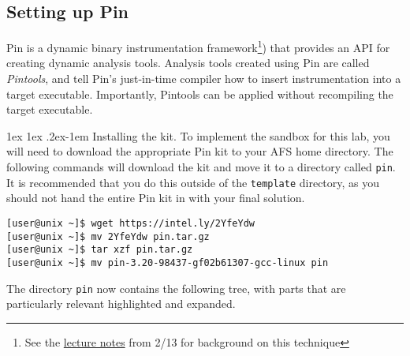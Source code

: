\documentclass[11pt]{article}
\makeatletter
\renewcommand{\paragraph}{%
  \@startsection{paragraph}{4}%
  {\z@}{1ex \@plus 1ex \@minus .2ex}{-1em}%
  {\normalfont\normalsize\bfseries}
}
\makeatother
\begin{document}
\subsection{Setting up Pin} 
\label{sect:pinsetup}
Pin is a dynamic binary instrumentation framework\footnote{See the \href{https://15316-cmu.github.io/lectures/09-automata.pdf}{lecture notes} from 2/13 for background on this technique}) that provides an API for creating dynamic analysis tools. Analysis tools created using Pin are called \emph{Pintools}, and tell Pin's just-in-time compiler how to insert instrumentation into a target executable. Importantly, Pintools can be applied without recompiling the target executable.

\paragraph{Installing the kit.}
To implement the sandbox for this lab, you will need to download the appropriate Pin kit to your AFS home directory. The following commands will download the kit and move it to a directory called \verb'pin'. It is recommended that you do this outside of the \verb'template' directory, as you should not hand the entire Pin kit in with your final solution.
\begin{lstlisting}[basicstyle=\footnotesize\ttfamily,backgroundcolor=\color{gray!15}]
[user@unix ~]$ wget https://intel.ly/2YfeYdw 
[user@unix ~]$ mv 2YfeYdw pin.tar.gz
[user@unix ~]$ tar xzf pin.tar.gz
[user@unix ~]$ mv pin-3.20-98437-gf02b61307-gcc-linux pin
\end{lstlisting}
The directory \verb'pin' now contains the following tree, with parts that are particularly relevant highlighted and expanded.
\\


\vspace*{1em}
\end{document}
